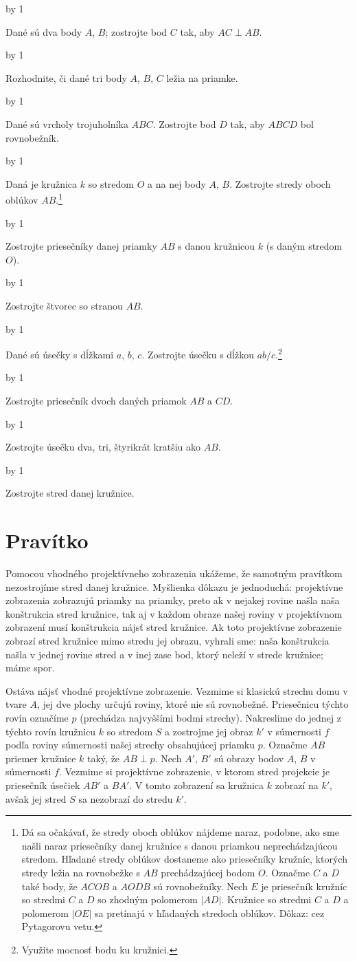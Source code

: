 \documentclass[a4paper]{article}
\def\pr{
    \smallskip
    \noindent {\bf \the\problemNumber.}
    \advance\problemNumber by 1
}
\begin{document}
\pr
Dané sú dva body $A$, $B$; zostrojte bod $C$ tak, aby $AC\perp AB$.

\pr
Rozhodnite, či dané tri body $A$, $B$, $C$ ležia na priamke.

\pr
Dané sú vrcholy trojuholníka $ABC$. Zostrojte bod $D$ tak, aby $ABCD$ bol rovnobežník.

\pr
Daná je kružnica $k$ so stredom $O$ a na nej body $A$, $B$. Zostrojte stredy oboch oblúkov $AB$.\footnote{Dá sa očakávať, že stredy oboch oblúkov nájdeme naraz, podobne, ako sme našli naraz priesečníky danej kružnice s danou priamkou neprechádzajúcou stredom. Hľadané stredy oblúkov dostaneme ako priesečníky kružníc, ktorých stredy ležia na rovnobežke s $AB$ prechádzajúcej bodom $O$. Označme $C$ a $D$ také body, že $ACOB$ a $AODB$ sú rovnobežníky. Nech $E$ je priesečník kružníc so stredmi $C$ a $D$ so zhodným polomerom $|AD|$. Kružnice so stredmi $C$ a $D$ a polomerom $|OE|$ sa pretínajú v hľadaných stredoch oblúkov. Dôkaz: cez Pytagorovu vetu.}

\pr
Zostrojte priesečníky danej priamky $AB$ s danou kružnicou $k$ (s daným stredom $O$).

\pr
Zostrojte štvorec so stranou $AB$.

\pr
Dané sú úsečky s dĺžkami $a$, $b$, $c$. Zostrojte úsečku s dĺžkou $ab/c$.\footnote{Využite mocnosť bodu ku kružnici.}

\pr
Zostrojte priesečník dvoch daných priamok $AB$ a $CD$.

\pr
Zostrojte úsečku dva, tri, štyrikrát kratšiu ako $AB$.

\pr
Zostrojte stred danej kružnice.

\section{Pravítko}

Pomocou vhodného projektívneho zobrazenia ukážeme, že samotným pravítkom nezostrojíme stred danej kružnice.
Myšlienka dôkazu je jednoduchá: projektívne zobrazenia zobrazujú priamky na priamky, preto ak v nejakej rovine našla naša konštrukcia stred kružnice, tak aj v každom obraze našej roviny v projektívnom zobrazení musí konštrukcia nájsť stred kružnice. Ak toto projektívne zobrazenie zobrazí stred kružnice mimo stredu jej obrazu, vyhrali sme: naša konštrukcia našla v jednej rovine stred a v inej zase bod, ktorý neleží v strede kružnice; máme spor.

Ostáva nájsť vhodné projektívne zobrazenie. Vezmime si klasickú strechu domu v tvare $A$, jej dve plochy určujú roviny, ktoré nie sú rovnobežné. Priesečnicu týchto rovín označíme $p$ (prechádza najvyššími bodmi strechy). Nakreslime do jednej z týchto rovín kružnicu $k$ so stredom $S$ a zostrojme jej obraz $k'$ v súmernosti $f$ podľa roviny súmernosti našej strechy obsahujúcej priamku $p$. Označme $AB$ priemer kružnice $k$ taký, že $AB\perp p$.
Nech $A'$, $B'$ sú obrazy bodov $A$, $B$ v súmernosti $f$. Vezmime si projektívne zobrazenie, v ktorom stred projekcie je priesečník úsečiek $AB'$ a $BA'$. V tomto zobrazení sa kružnica $k$ zobrazí na $k'$, avšak jej stred $S$ sa nezobrazí do stredu $k'$.
\end{document}
